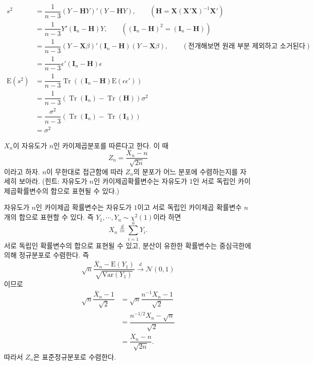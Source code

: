 \documentclass[answers]{exam}
\DeclareMathOperator{\Tr}{Tr}
\begin{document}
\begin{questions}
\begin{solution}
\begin{enumerate}
      \begin{align}
        s^{2} &= \dfrac{1}{n-3}\left(Y-\mathbf{H}Y\right)'\left(Y-\mathbf{H}Y\right),\qquad \left(\mathbf{H}=\mathbf{X}\left(\mathbf{X}'\mathbf{X}\right)^{-1}\mathbf{X}'\right)\\
        &= \dfrac{1}{n-3}Y'\left(\mathbf{I}_{n}-\mathbf{H}\right)Y,\qquad \left(\left(\mathbf{I}_{n}-\mathbf{H}\right)^{2}=\left(\mathbf{I}_{n}-\mathbf{H}\right)\right)\\
        &= \dfrac{1}{n-3}\left(Y-\mathbf{X}\beta\right)'\left(\mathbf{I}_{n}-\mathbf{H}\right)\left(Y-\mathbf{X}\beta\right),\qquad (\text{전개해보면 원래 부분 제외하고 소거된다})\\
        &= \dfrac{1}{n-3}\epsilon'\left(\mathbf{I}_{n}-\mathbf{H}\right)\epsilon\\
        \mathrm{E}\left(s^{2}\right) &= \dfrac{1}{n-3}\Tr\left(\left(\mathbf{I}_{n}-\mathbf{H}\right)\mathrm{E}\left(\epsilon\epsilon'\right)\right)\\
        &=\dfrac{1}{n-3}\left(\Tr\left(\mathbf{I}_{n}\right)-\Tr\left(\mathbf{H}\right)\right)\sigma^{2}\\
        &=\dfrac{\sigma^{2}}{n-3}\left(\Tr\left(\mathbf{I}_{n}\right)-\Tr\left(\mathbf{I}_{3}\right)\right)\\
        &=\sigma^{2}
      \end{align}
    \end{enumerate}
   \end{solution}
   \question
   $X_{n}$이 자유도가 $n$인 카이제곱분포를 따른다고 한다. 이 때
   $$
    Z_{n}=\dfrac{X_{n}-n}{\sqrt{2n}}
   $$
   이라고 하자. $n$이 무한대로 접근함에 따라 $Z_{n}$의 분포가 어느 분포에 수렴하는지를 자세히 보아라. (힌트: 자유도가 $n$인 카이제곱확률변수는 자유도가 1인 서로 독립인 카이제곱확률변수의 합으로 표현될 수 있다.)
   \begin{solution}
    자유도가 $n$인 카이제곱 확률변수는 자유도가 $1$이고 서로 독립인 카이제곱 확률변수 $n$개의 합으로 표현할 수 있다. 즉 $Y_{1},\cdots,Y_{n}\sim \chi^{2}\left(1\right)$이라 하면
    $$
      X_{n} \overset{d}{\equiv}\sum_{i=1}^{n}Y_{i}.
    $$
    서로 독립인 확률변수의 합으로 표현될 수 있고, 분산이 유한한 확률변수는 중심극한에 의해 정규분포로 수렴한다. 즉 
    $$
      \sqrt{n}\dfrac{\overline{X}_{n}-\mathrm{E}\left(Y_{1}\right)}{\sqrt{\mathrm{Var}\left(Y_{1}\right)}} \xrightarrow{d} \mathcal{N}\left(0,1\right)
    $$
    이므로
    \begin{align}
      \sqrt{n}\dfrac{\overline{X}_{n}-1}{\sqrt{2}} &= \sqrt{n}\dfrac{n^{-1}X_{n}-1}{\sqrt{2}}\\
      &= \dfrac{n^{-1/2}X_{n}-\sqrt{n}}{\sqrt{2}}\\
      &= \dfrac{X_{n}-n}{\sqrt{2n}}.
    \end{align}
    따라서 $Z_{n}$은 표준정규분포로 수렴한다.
   \end{solution}
\end{questions}
\end{document}

